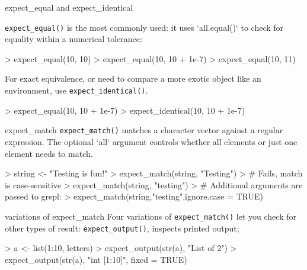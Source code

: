\documentclass[12pt,handout]{beamer}
\begin{document}
\begin{frame}[fragile]{expect\_equal and expect\_identical}

\texttt{expect\_equal()} is the most commonly used: it 
    uses `all.equal()` to check for equality within a numerical tolerance:

\begin{Schunk}
\begin{Sinput}
>     expect_equal(10, 10)
>     expect_equal(10, 10 + 1e-7)
>     expect_equal(10, 11)
\end{Sinput}
\end{Schunk}
  
For exact equivalence, or need to compare a more exotic object like an environment, 
use \texttt{expect\_identical()}.

\begin{Schunk}
\begin{Sinput}
>     expect_equal(10, 10 + 1e-7)
>     expect_identical(10, 10 + 1e-7)
\end{Sinput}
\end{Schunk}

\end{frame}


\begin{frame}[fragile]{expect\_match}
\texttt{expect\_match()} matches a character vector against a regular expression. 
    The optional `all` argument controls whether all elements or just one 
    element needs to match.

\begin{Schunk}
\begin{Sinput}
>     string <- "Testing is fun!"
>     expect_match(string, "Testing") 
>     # Fails, match is case-sensitive
>     expect_match(string, "testing")
>     # Additional arguments are passed to grepl:
>     expect_match(string,"testing",ignore.case = TRUE)
\end{Sinput}
\end{Schunk}

\end{frame}


\begin{frame}[fragile]{variations of expect\_match}
Four variations of \texttt{expect\_match()} let you check for other types of 
    result: \texttt{expect\_output()}, inspects printed output;     
\begin{Schunk}
\begin{Sinput}
>     a <- list(1:10, letters)
>     expect_output(str(a), "List of 2")
>     expect_output(str(a), "int [1:10]", fixed = TRUE)
\end{Sinput}
\end{Schunk}
\end{frame}
\end{document}
